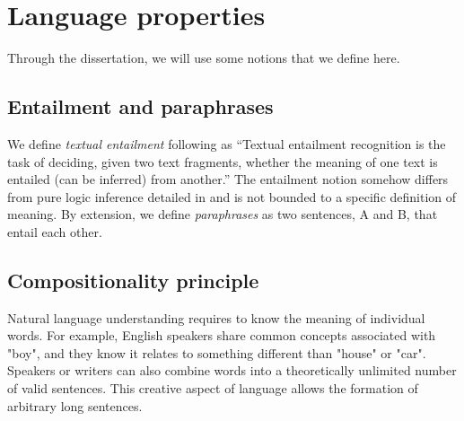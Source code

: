 \section{Language properties}

Through the dissertation, we will use some notions that we define here.

\subsection{Entailment and paraphrases}

We define \textit{textual entailment} following \textcite{dagan_10} as ``Textual entailment recognition is the task of deciding, given two text fragments, whether the meaning of one text is entailed (can be inferred) from another.'' The entailment notion somehow differs from pure logic inference detailed in  and is not bounded to a specific definition of meaning. By extension, we define \textit{paraphrases} as two sentences, A and B, that entail each other.


\subsection{Compositionality principle}

Natural language understanding requires to know the meaning of individual words. For example, English speakers share common concepts associated with "boy", and they know it relates to something different than "house" or "car". Speakers or writers can also combine words into a theoretically unlimited number of valid sentences. This creative aspect of language allows the formation of arbitrary long sentences. 

